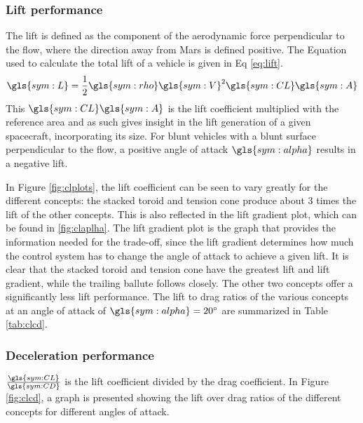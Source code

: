 \subsubsection{Lift performance}
\label{sec:LiftPer}
The lift is defined as the component of the aerodynamic force perpendicular to the flow, where the direction away from Mars is defined positive. The Equation used to calculate the total lift of a vehicle is given in Eq \ref{eq:lift}.
\begin{equation}
\gls{sym:L} = \frac{1}{2}\gls{sym:rho}\gls{sym:V}^2\gls{sym:CL}\gls{sym:A}
\label{eq:lift}
\end{equation}
This $\gls{sym:CL}\gls{sym:A}$ is the lift coefficient multiplied with the reference area and as such gives insight in the lift generation of a given spacecraft, incorporating its size. For blunt vehicles with a blunt surface perpendicular to the flow, a positive angle of attack $\gls{sym:alpha}$ results in a negative lift.

In Figure \ref{fig:clplots}, the lift coefficient can be seen to vary greatly for the different concepts: the stacked toroid and tension cone produce about 3 times the lift of the other concepts. This is also reflected in the lift gradient plot, which can be found in \ref{fig:claplha}. The lift gradient plot is the graph that provides the information needed for the trade-off, since the lift gradient determines how much the control system has to change the angle of attack to achieve a given lift. It is clear that the stacked toroid and tension cone have the greatest lift and lift gradient, while the trailing ballute follows closely. The other two concepts offer a significantly less lift performance. The lift to drag ratios of the various concepts at an angle of attack of $\gls{sym:alpha}=20^\circ$ are summarized in Table \ref{tab:clcd}.



\subsubsection{Deceleration performance}
$\frac{\gls{sym:CL}}{\gls{sym:CD}}$ is the lift coefficient divided by the drag coefficient. In Figure \ref{fig:clcd}, a graph is presented showing the lift over drag ratios of the different concepts for different angles of attack.


